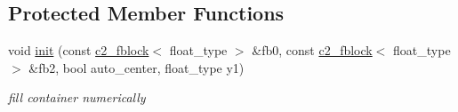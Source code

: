 \subsection*{Protected Member Functions}
\begin{DoxyCompactItemize}
\item 
\hypertarget{classc2__connector__function__p_af5f4cfcfcaf990a779710f25dedfff9b}{void \hyperlink{classc2__connector__function__p_af5f4cfcfcaf990a779710f25dedfff9b}{init} (const \hyperlink{classc2__fblock}{c2\-\_\-fblock}$<$ float\-\_\-type $>$ \&fb0, const \hyperlink{classc2__fblock}{c2\-\_\-fblock}$<$ float\-\_\-type $>$ \&fb2, bool auto\-\_\-center, float\-\_\-type y1)}\label{classc2__connector__function__p_af5f4cfcfcaf990a779710f25dedfff9b}

\begin{DoxyCompactList}\small\item\em fill container numerically \end{DoxyCompactList}\end{DoxyCompactItemize}
